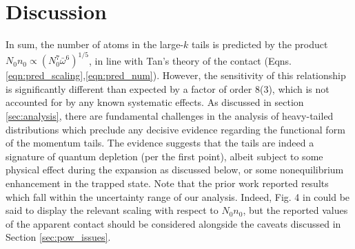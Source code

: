 {%




\section{Discussion}
\label{sec:discussion}

	
	

	In sum, the number of atoms in the large-$k$ tails is predicted by the product $N_0n_0\propto(N_{0}^7\bar{\omega}^6)^{1/5}$, in line with Tan's theory of the contact (Eqns. \ref{eqn:pred_scaling},\ref{eqn:pred_num}). 
	However, the sensitivity of this relationship is significantly different than expected by a factor of order 8(3), which is not accounted for by any known systematic effects.
	As discussed in section \ref{sec:analysis}, there are fundamental challenges in the analysis of heavy-tailed distributions which preclude any decisive evidence regarding the functional form of the momentum tails.
	The evidence suggests that the tails are indeed a signature of quantum depletion (per the first point), albeit subject to some physical effect during the expansion as discussed below, {or some nonequilibrium enhancement in the trapped state}.
	Note that the prior work \cite{Chang16} reported results which fall within the uncertainty range of our analysis.
	Indeed, Fig. 4 in \cite{Chang16} could be said to display the relevant scaling with respect to $N_0n_0$, but the reported values of the apparent contact should be considered alongside the caveats discussed in Section \ref{sec:pow_issues}.
	
}
